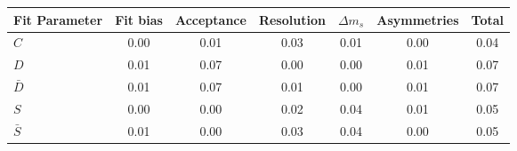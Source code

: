 \begin{tabular}{l  c  c  c  c  c  | c }
\hline
\hline
Fit Parameter & Fit bias & Acceptance & Resolution & $\Delta m_{s}$ & Asymmetries &  Total  \\ 
\hline
$C$ & 0.00 & 0.01 & 0.03 & 0.01 & 0.00 & 0.04 \\ 
$D$ & 0.01 & 0.07 & 0.00 & 0.00 & 0.01 & 0.07 \\ 
$\bar{D}$ & 0.01 & 0.07 & 0.01 & 0.00 & 0.01 & 0.07 \\ 
$S$ & 0.00 & 0.00 & 0.02 & 0.04 & 0.01 & 0.05 \\ 
$\bar{S}$ & 0.01 & 0.00 & 0.03 & 0.04 & 0.00 & 0.05 \\ 
\hline
\hline
\end{tabular}
